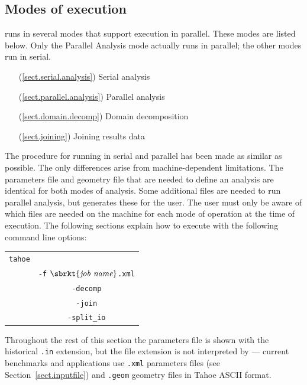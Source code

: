 \subsection{Modes of execution}
\tahoe runs in several modes that support execution in parallel.
These modes are listed below.  Only the Parallel Analysis mode
actually runs in parallel; the other modes run in serial.
\begin{itemize}
\item[(\ref{sect.serial.analysis})] Serial analysis
\item[(\ref{sect.parallel.analysis})] Parallel analysis
\item[(\ref{sect.domain.decomp})] Domain decomposition
\item[(\ref{sect.joining})] Joining results data
\end{itemize}
The procedure for running in serial and parallel has been made as similar
as possible.  The only differences arise from machine-dependent
limitations.  The parameters file and geometry file that are needed to
define an analysis are identical for both modes of analysis.  Some
additional files are needed to run parallel analysis, but \tahoe generates
these for the user.  The user must only be aware of which files are needed
on the machine for each mode of operation at the time of execution.  The
following sections explain how to execute \tahoe with the following command
line options:
\begin{center}
\begin{tabular}[c]{c c}
\parbox[b]{2.0in}{\raggedleft \texttt{tahoe}} &\parbox[b]{2.0in}{}\\
&\parbox[b]{2.0in}{\texttt{-f} $\sbrkt{\textit{job name}}$\texttt{.xml}}\\
&\parbox[b]{2.0in}{\texttt{-decomp}}\\
&\parbox[b]{2.0in}{\texttt{-join}}\\
&\parbox[b]{2.0in}{\texttt{-split\_io}}\\
\end{tabular}
\end{center}
Throughout the rest of this section the parameters file is shown with
the historical \texttt{.in} extension, but the file extension is not
interpreted by \tahoe --- current benchmarks and applications use
\texttt{.xml} parameters files (see Section~\ref{sect.inputfile}) and
\texttt{.geom} geometry files in Tahoe ASCII format.

